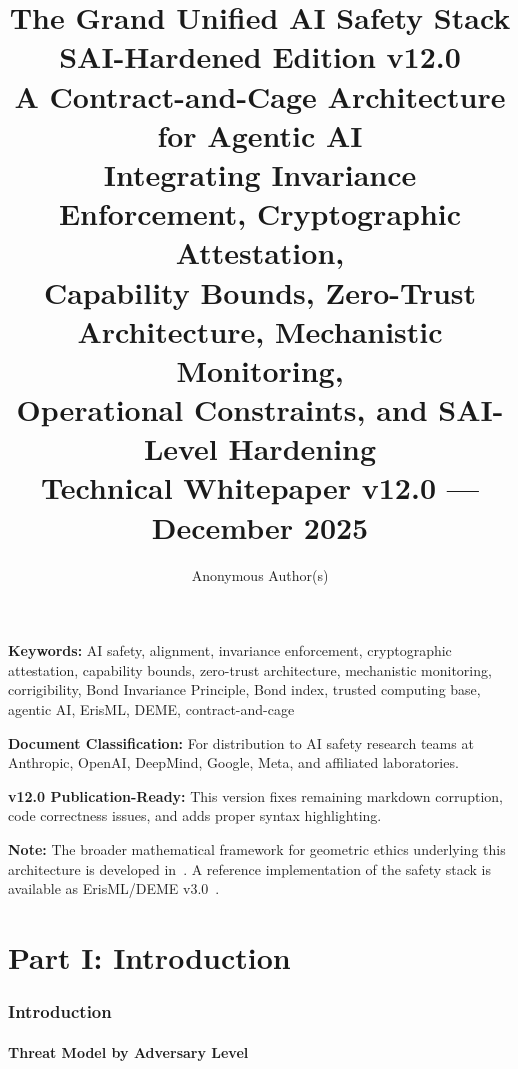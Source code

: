 \documentclass[11pt,letterpaper]{article}
\title{\textbf{The Grand Unified AI Safety Stack}\\
\Large SAI-Hardened Edition v12.0\\[0.5em]
\large A Contract-and-Cage Architecture for Agentic AI\\[0.5em]
\normalsize Integrating Invariance Enforcement, Cryptographic Attestation,\\
Capability Bounds, Zero-Trust Architecture, Mechanistic Monitoring,\\
Operational Constraints, and SAI-Level Hardening\\[1em]
Technical Whitepaper v12.0 --- December 2025}
\author{Anonymous Author(s)}
\date{}
\theoremstyle{definition}
\theoremstyle{remark}
\begin{document}
\maketitle

\noindent\textbf{Keywords:} AI safety, alignment, invariance enforcement, cryptographic attestation, capability bounds, zero-trust architecture, mechanistic monitoring, corrigibility, Bond Invariance Principle, Bond index, trusted computing base, agentic AI, ErisML, DEME, contract-and-cage

\medskip

\noindent\textbf{Document Classification:} For distribution to AI safety research teams at Anthropic, OpenAI, DeepMind, Google, Meta, and affiliated laboratories.

\medskip

\noindent\textbf{v12.0 Publication-Ready:} This version fixes remaining markdown corruption, code correctness issues, and adds proper syntax highlighting.

\medskip

\noindent\textbf{Note:} The broader mathematical framework for geometric ethics underlying this architecture is developed in~\cite{bond2026ge}. A reference implementation of the safety stack is available as ErisML/DEME v3.0~\cite{bond2026erisml}.


\part*{Part I: Introduction}

\section{Introduction}

\subsection{Threat Model by Adversary Level}
\end{document}
